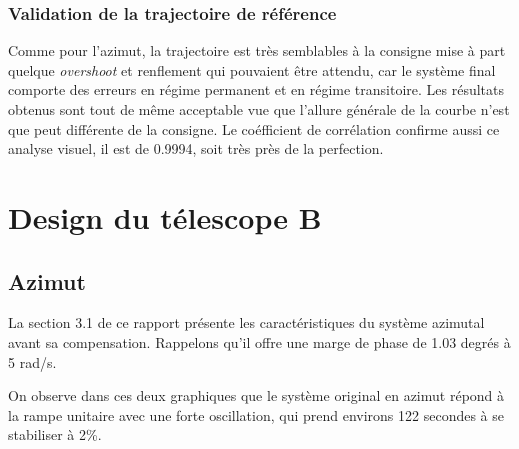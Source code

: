 \documentclass{udes_rapport} %
\begin{document}
\subsubsection{Validation de la trajectoire de référence}
Comme pour l'azimut, la trajectoire est très semblables à la consigne mise à part quelque \textit{overshoot} et renflement qui pouvaient être attendu, car  le système final comporte des erreurs en régime permanent et en régime transitoire. Les résultats obtenus sont tout de même acceptable vue que l'allure générale de la courbe n'est que peut différente de la consigne. Le coéfficient de corrélation confirme aussi ce analyse visuel, il est de 0.9994, soit très près de la perfection.
\section{Design du télescope B}
\subsection{Azimut}
La section 3.1 de ce rapport présente les caractéristiques du système azimutal avant sa compensation. Rappelons qu'il offre une marge de phase de 1.03 degrés à 5 rad/s. 
\noindent\begin{minipage}{\textwidth}
 

\begin{minipage}{0.5\textwidth}
\end{minipage} 
\begin{minipage}{0.5\textwidth}
\end{minipage}%

\label{fig:init_B_AZ} 
\end{minipage}
On observe dans ces deux graphiques que le système original en azimut répond à la rampe unitaire avec une forte oscillation, qui prend environs 122 secondes à se stabiliser à 2\%.
\end{document}
